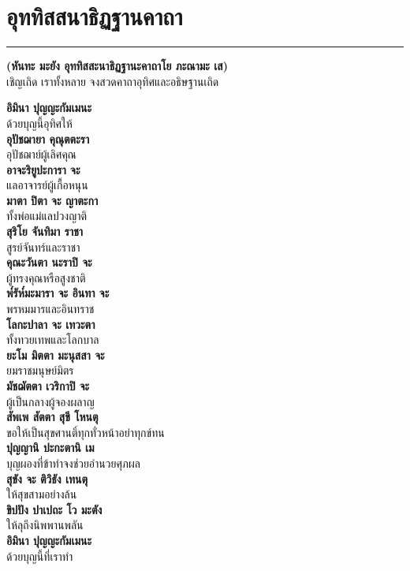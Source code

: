 \documentclass[12pt]{article}
\begin{document}
\pagebreak
\section{อุททิสสนาธิฏฐานคาถา}
\hrule
\begin{center}
\textbf{(หันทะ มะยัง อุททิสสะนาธิฏฐานะคาถาโย ภะณามะ เส)}\\
เชิญเถิด เราทั้งหลาย จงสวดคาถาอุทิศและอธิษฐานเถิด
\end{center}
\textbf{อิมินา ปุญญะกัมเมนะ}\\
\indent ด้วยบุญนี้อุทิศให้\\
\textbf{อุปัชฌายา คุณุตตะรา}\\
\indent อุปัชฌาย์ผู้เลิศคุณ\\
\textbf{อาจะริยูปะการา จะ}\\
\indent แลอาจารย์ผู้เกื้อหนุน\\
\textbf{มาตา ปิตา จะ ญาตะกา}\\
\indent ทั้งพ่อแม่แลปวงญาติ\\
\textbf{สุริโย จันทิมา ราชา}\\
\indent สูรย์จันทร์และราชา\\
\textbf{คุณะวันตา นะราปิ จะ}\\
\indent ผู้ทรงคุณหรือสูงชาติ\\
\textbf{พ๎รัห๎มะมารา จะ อินทา จะ}\\
\indent พรหมมารและอินทราช\\
\textbf{โลกะปาลา จะ เทวะตา}\\
\indent ทั้งทวยเทพและโลกบาล\\
\textbf{ยะโม มิตตา มะนุสสา จะ}\\
\indent ยมราชมนุษย์มิตร\\
\textbf{มัชฌัตตา เวริกาปิ จะ}\\
\indent ผู้เป็นกลางผู้จองผลาญ\\
\textbf{สัพเพ สัตตา สุขี โหนตุ}\\
\indent ขอให้เป็นสุขศานติ์ทุกทั่วหน้าอย่าทุกข์ทน\\
\textbf{ปุญญานิ ปะกะตานิ เม}\\
\indent บุญผองที่ข้าทำจงช่วยอำนวยศุภผล\\
\textbf{สุขัง จะ ติวิธัง เทนตุ}\\
\indent ให้สุขสามอย่างล้น\\
\textbf{ขิปปัง ปาเปถะ โว มะตัง}\\
\indent ให้ลุถึงนิพพานพลัน\\
\textbf{อิมินา ปุญญะกัมเมนะ}\\
\indent ด้วยบุญนี้ที่เราทำ\\
\end{document}
